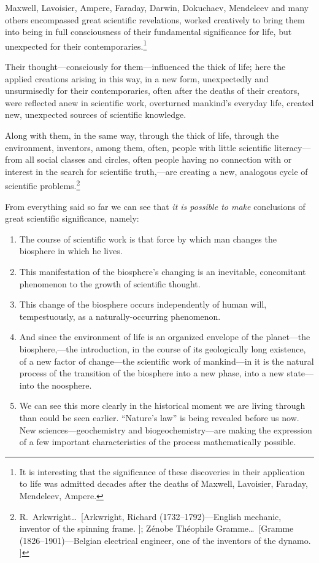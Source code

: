 Maxwell, Lavoisier, Ampere, Faraday, Darwin, Dokuchaev, Mendeleev and many
others encompassed great scientific revelations, worked creatively to bring
them into being in full consciousness of their fundamental significance for
life, but unexpected for their contemporaries.\footnote{%
	It is interesting that the significance of these discoveries in their
	application to life was admitted decades after the deaths of Maxwell,
	Lavoisier, Faraday, Mendeleev,  Ampere.
}

Their thought---consciously for them---influenced the thick of life; here the
applied creations arising in this way, in a new form, unexpectedly and
unsurmisedly for their contemporaries, often after the deaths of their
creators, were reflected anew in scientific work, overturned mankind's everyday
life,  created new, unexpected sources of scientific
knowledge.

Along with them, in the same way, through the thick of life, through the
environment, inventors, among them, often, people with little scientific
literacy---from all social classes and circles, often people having no
connection with or interest in the search for scientific truth,---are creating
a new, analogous cycle of scientific problems.\footnote{%
	R.\ Arkwright\dots\ [Arkwright, Richard (1732--1792)---English
	mechanic, inventor of the spinning frame. ]; Zénobe
	Théophile Gramme\dots\ [Gramme (1826--1901)---Belgian electrical
	engineer, one of the inventors of the dynamo. ]
}


\Section %
From everything said so far we can see that \emph{it is possible to make}
conclusions of great scientific significance, namely:
\begin{enumerate}
  \item The course of scientific work is that force by which man changes the
  	biosphere in which he lives.
  \item This manifestation of the biosphere's changing is an inevitable,
  	concomitant phenomenon to the growth of scientific thought.
  \item This change of the biosphere occurs independently of human will,
  	tempestuously, as a naturally-occurring phenomenon.
  \item And since the environment of life is an organized envelope of the
  	planet---the biosphere,---the introduction, in the course of its
	geologically long existence, of a new factor of change---the scientific
	work of mankind---in it is the natural process of the transition of the
	biosphere into a new phase, into a new state---into the noosphere.
  \item We can see this more clearly in the historical moment we are living
  	through than could be seen earlier.  ``Nature's law'' is being revealed
	before us now.  New sciences---geochemistry and biogeochemistry---are
	making the expression of a few important characteristics of the process
	mathematically possible.
\end{enumerate}


